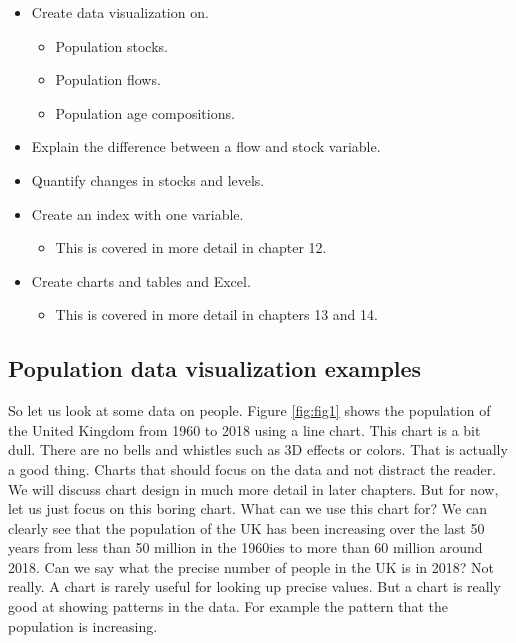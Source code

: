 \documentclass[]{book}
\providecommand{\tightlist}{%
  \setlength{\itemsep}{0pt}\setlength{\parskip}{0pt}}
\begin{document}
\begin{itemize}
\tightlist
\item
  Create data visualization on.

  \begin{itemize}
  \tightlist
  \item
    Population stocks.
  \item
    Population flows.
  \item
    Population age compositions.
  \end{itemize}
\item
  Explain the difference between a flow and stock variable.
\item
  Quantify changes in stocks and levels.
\item
  Create an index with one variable.

  \begin{itemize}
  \tightlist
  \item
    This is covered in more detail in chapter 12.
  \end{itemize}
\item
  Create charts and tables and Excel.

  \begin{itemize}
  \tightlist
  \item
    This is covered in more detail in chapters 13 and 14.
  \end{itemize}
\end{itemize}

\hypertarget{population-data-visualization-examples}{%
\subsection{Population data visualization examples}\label{population-data-visualization-examples}}

So let us look at some data on people. Figure \ref{fig:fig1} shows the population of the United Kingdom from 1960 to 2018 using a line chart. This chart is a bit dull. There are no bells and whistles such as 3D effects or colors. That is actually a good thing. Charts that should focus on the data and not distract the reader. We will discuss chart design in much more detail in later chapters. But for now, let us just focus on this boring chart. What can we use this chart for? We can clearly see that the population of the UK has been increasing over the last 50 years from less than 50 million in the 1960ies to more than 60 million around 2018. Can we say what the precise number of people in the UK is in 2018? Not really. A chart is rarely useful for looking up precise values. But a chart is really good at showing patterns in the data. For example the pattern that the population is increasing.
\end{document}
